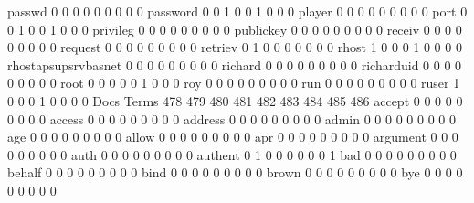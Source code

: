 \documentclass[compress,8pt]{beamer}
\begin{document}
\begin{frame}
\begin{Schunk}
  passwd                                     0   0   0   0   0   0   0   0   0
  password                                   0   0   1   0   0   1   0   0   0
  player                                     0   0   0   0   0   0   0   0   0
  port                                       0   0   1   0   0   1   0   0   0
  privileg                                   0   0   0   0   0   0   0   0   0
  publickey                                  0   0   0   0   0   0   0   0   0
  receiv                                     0   0   0   0   0   0   0   0   0
  request                                    0   0   0   0   0   0   0   0   0
  retriev                                    0   1   0   0   0   0   0   0   0
  rhost                                      1   0   0   0   1   0   0   0   0
  rhostapsupsrvbasnet                        0   0   0   0   0   0   0   0   0
  richard                                    0   0   0   0   0   0   0   0   0
  richarduid                                 0   0   0   0   0   0   0   0   0
  root                                       0   0   0   0   0   1   0   0   0
  roy                                        0   0   0   0   0   0   0   0   0
  run                                        0   0   0   0   0   0   0   0   0
  ruser                                      1   0   0   0   1   0   0   0   0
                                          Docs
Terms                                      478 479 480 481 482 483 484 485 486
  accept                                     0   0   0   0   0   0   0   0   0
  access                                     0   0   0   0   0   0   0   0   0
  address                                    0   0   0   0   0   0   0   0   0
  admin                                      0   0   0   0   0   0   0   0   0
  age                                        0   0   0   0   0   0   0   0   0
  allow                                      0   0   0   0   0   0   0   0   0
  apr                                        0   0   0   0   0   0   0   0   0
  argument                                   0   0   0   0   0   0   0   0   0
  auth                                       0   0   0   0   0   0   0   0   0
  authent                                    0   1   0   0   0   0   0   0   1
  bad                                        0   0   0   0   0   0   0   0   0
  behalf                                     0   0   0   0   0   0   0   0   0
  bind                                       0   0   0   0   0   0   0   0   0
  brown                                      0   0   0   0   0   0   0   0   0
  bye                                        0   0   0   0   0   0   0   0   0

\end{Schunk}
\end{frame}
\end{document}
